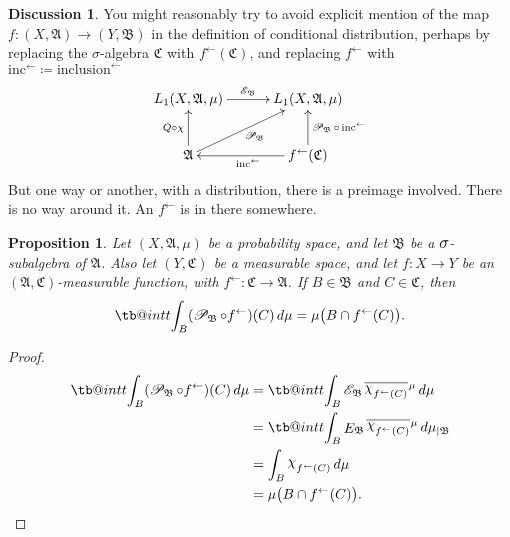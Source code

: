 \documentclass[
twoside=true,
paper=letter,
fontsize=9pt,
pagesize=auto,
leqno,
openany,
headsepline,
overfullrule,
]{scrbook}
\makeatletter
\theoremstyle{plain}
\theoremstyle{plain}
\newtheorem{prop}[thm]{Proposition}
\theoremstyle{definition}
\newtheorem{discussion}[thm]{Discussion}
\theoremstyle{bfnoteitalic}
\theoremstyle{bfnoteroman}
\newcommand{\sigalg}[1]{\mathfrak{#1}}
\newcommand{\cali}[1]{\mathscr{#1}}
\newcommand{\definedby}{\coloneqq}
\newcommand{\kondexpsub}[2]
{\mathop{E}\nolimits_{#2}\hspace{-1pt}#1}
\newcommand{\condexpsub}[2]
{\mathop{\cali{E}\hspace{-1.5pt}}\nolimits_{#2}\hspace{-1pt}#1}
\newcommand{\condexpop}[1]{\mathop{\cali{E}\hspace{-1pt}}\nolimits_{#1}}
\newcommand{\condprobop}[1]{\mathop{\cali{P}\hspace{-1pt}}\nolimits_{#1}}
\newcommand{\textsigma}{\hbox{\large{$\sigma$}}\kern-1pt}
\newcommand{\charfunction}[1]{{\raisebox{2pt}{$\chi$}}_{#1}}
\newcommand{\restrictedto}[1]{_{\lvert#1}\kern-1.5pt}
\newcommand{\preimage}[1]{#1^{\leftarrow}}
\newcommand{\meets}{\cap}
\newcommand{\sigmaalgebra}{\sigalg{A}}
\newcommand{\sigmaalgebraii}{\sigalg{B}}
\newcommand{\sigmaalgebraiii}{\sigalg{C}}
\newcommand{\Lone}{L_1(\measurespace, \sigmaalgebra, \measure)}
\newcommand{\function}{f}
\newcommand{\measurespace}{X}
\newcommand{\measurespaceii}{Y}
\newcommand{\measure}{\mu}
\newcommand{\setii}{B}
\newcommand{\setiii}{C}
\newcommand*\xbar[1]{%
   \hbox{%
     \vbox{%
       \hrule height 0.4pt %
       \kern0.4ex%
       \hbox{%
         \ensuremath{#1}%
       }%
     }%
   }%
}
\newcommand\tint{\mathop{\mathpalette\tb@int{t}}\!\int}
\newcommand\tb@int[2]{%
  \sbox\z@{$\m@th#1\int$}%
  \if#2t%
    \rlap{\hbox to\wd\z@{%
      \hfil
      \vrule width .35em height \dimexpr\ht\z@+1.4pt\relax depth -\dimexpr\ht\z@+1pt\relax
      \kern.05em %
    }}
  \else
    \rlap{\hbox to\wd\z@{%
      \vrule width .35em height -\dimexpr\dp\z@+1pt\relax depth \dimexpr\dp\z@+1.4pt\relax
      \hfil
    }}
  \fi
}
\newcommand{\lebclass}[1]{\hspace{.5pt}\xbar{#1}\hspace{0.5pt}}
\newcommand{\ellclass}[2]{\lebclass{#1}^{#2}}
\newcommand{\inducedint}{\tint}
\makeatother
\begin{document}
\begin{discussion}\label{avoid_function}
You might reasonably try to avoid explicit mention of the map 
$\function:(\measurespace,\sigmaalgebra)\to (\measurespaceii,\sigmaalgebraii)$
in the definition of conditional distribution, perhaps by replacing the \textsigma\hyp{}algebra 
$\sigmaalgebraiii$ with $\preimage{\function}(\sigmaalgebraiii)$, and replacing
$\preimage{\function}$ with 
$\preimage{\text{inc}} \definedby \preimage{\text{inclusion}}$
\[
\xymatrix@C=30pt{ 
\Lone \ar[r]^{\condexpop{\sigmaalgebraii}} 
& \Lone 
\\
\sigmaalgebra 
\ar[u]^-{Q\circ\chi} 
\ar[ur]_{\condprobop{\sigmaalgebraii}} 
& \preimage{\function}(\sigmaalgebraiii) \ar[l]^{\preimage{\text{inc}}} 
\ar[u]_{\condprobop{\sigmaalgebraii}\circ\,\preimage{\text{inc}}}
}
\]
But one way or another, with a distribution, there is a preimage involved.
There is no way around it.  An $\preimage{\function}$ is in there somewhere.
\end{discussion}



\begin{prop}\label{conditional_probability_of_a_set}
Let $(\measurespace, \sigmaalgebra, \measure)$ be a probability space, and let $\sigmaalgebraii$ be a $\textsigma$-subalgebra of $\sigmaalgebra$. Also let $(\measurespaceii, \sigmaalgebraiii)$ be a measurable space, and let 
$\function:\measurespace\to\measurespaceii$ be an
$(\sigmaalgebra, \sigmaalgebraiii)$\hyp{}measurable function, with
$\preimage{\function} : \sigmaalgebraiii \to \sigmaalgebra$.  
If $\setii\in\sigmaalgebraii$ and $\setiii\in\sigmaalgebraiii$, then
\[
\inducedint_\setii (\condprobop{\sigmaalgebraii}\circ \preimage{\function})(\setiii)\,d\measure
=
\measure\bigl(\setii\meets\preimage{\function}(\setiii)\bigr).
\]
\end{prop}


\begin{proof}
\begin{align*}
\inducedint_\setii (\condprobop{\sigmaalgebraii}\circ \preimage{\function})(\setiii)\,d\measure
&= \inducedint_\setii 
\condexpsub{\ellclass{\charfunction{\preimage{\function}(\setiii)}}{\measure}}{\sigmaalgebraii}
\,d\measure \\
&= \inducedint_\setii 
\kondexpsub{\ellclass{\charfunction{\preimage{\function}(\setiii)}}{\measure}}{\sigmaalgebraii}
\,d\measure\restrictedto{\sigmaalgebraii} \\
&= \int_\setii \charfunction{\preimage{f}(\setiii)}\,d\mu \\
&= \measure\bigl(\setii\meets\preimage{\function}(\setiii)\bigr).\\
\end{align*}
\end{proof}
\end{document}

